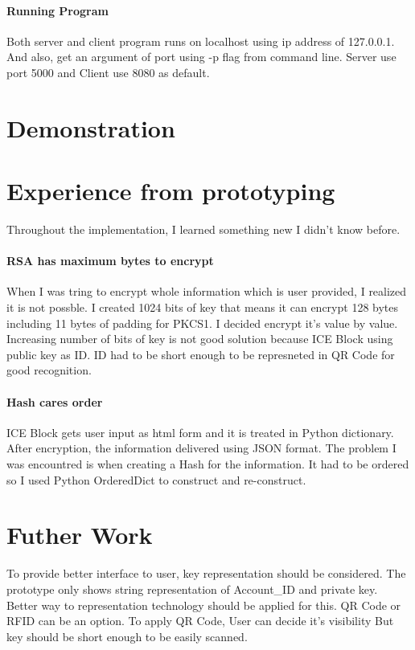 \documentclass[conference]{IEEEtran}
\begin{document}
\paragraph{Running Program}
Both server and client program runs on localhost using ip address of 127.0.0.1.
And also, get an argument of port using -p flag from command line.
Server use port 5000 and Client use 8080 as default.


\section{Demonstration}

\subsection{}



\section{Experience from prototyping}
Throughout the implementation, I learned something new I didn't know before.

\paragraph{RSA has maximum bytes to encrypt}
When I was tring to encrypt whole information which is user provided,
I realized it is not possble.\cite{r5} I created 1024 bits of key that means it can encrypt 
128 bytes including 11 bytes of padding for PKCS1.
I decided encrypt it's value by value. Increasing number of bits of key is not good solution because ICE Block using public key as ID.
ID had to be short enough to be represneted in QR Code for good recognition.

\paragraph{Hash cares order}
ICE Block gets user input as html form and it is treated in Python dictionary.
After encryption, the information delivered using JSON format.
The problem I was encountred is when creating a Hash for the information.
It had to be ordered so I used Python OrderedDict to construct and re-construct.

\section{Futher Work}
To provide better interface to user, key representation should be considered.
The prototype only shows string representation of Account\_ID and private key.
Better way to representation technology should be applied for this.
QR Code or RFID can be an option. To apply QR Code, User can decide it's visibility
But key should be short enough to be easily scanned.
\end{document}
